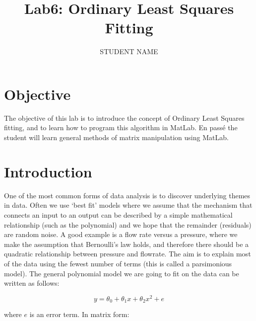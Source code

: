 \documentclass[11pt,letterpaper]{article}
\author{STUDENT NAME}
\title{Lab6: Ordinary Least Squares Fitting}
\begin{document}
\maketitle
 
\section{Objective}

The objective of this lab is to introduce the concept of Ordinary Least Squares fitting, and to learn how to program this algorithm in MatLab. En passé the student will learn general methods of matrix manipulation using MatLab.

\section{Introduction}

One of the most common forms of data analysis is to discover underlying themes in data. Often we use ‘best fit’ models where we assume that the mechanism that connects an input to an output can be described by a simple mathematical relationship (such as the polynomial) and we hope that the remainder (residuals) are random noise. A good example is a flow rate versus a pressure, where we make the assumption that Bernoulli's law holds, and therefore there should be a quadratic relationship between pressure and flowrate. The aim is to explain most of the data using the fewest number of terms (this is called a parsimonious model). The general polynomial model we are going to fit on the data can be written as follows:

\begin{equation} \label{Eqn:OLS1}
y = \theta_0 + \theta_1 x + \theta_2 x^2 + e
\end{equation}

where $e$ is an error term. In matrix form:

\newenvironment{spmatrix}[1]
 {\def\mysubscript{#1}\mathop\bgroup\begin{pmatrix}}
 {\end{pmatrix}\egroup_{\textstyle\mathstrut\mysubscript}}
 
\end{document}
